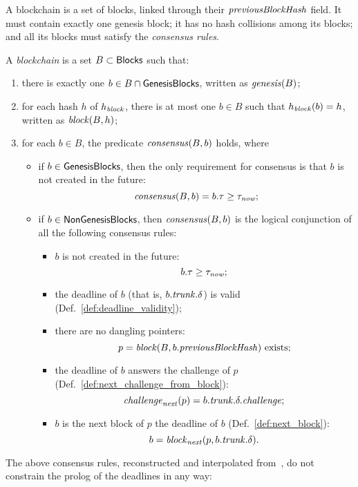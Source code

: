 A blockchain is a set of blocks, linked through their ${\mathit{previousBlockHash}}$ field.
It must contain exactly one genesis block; it has no hash collisions among its blocks;
and all its blocks must satisfy the \emph{consensus rules}.
%
\begin{definition}\label{def:blockchain}
  A \emph{blockchain} is a set $B\subset{\mathsf{Blocks}}$ such that:
  \begin{enumerate}
  \item there is exactly one $b\in B\cap{\mathsf{GenesisBlocks}}$, written as ${\mathit{genesis}}(B)$;
  \item for each hash $h$ of $h_{\mathit{block}}$, there is at most
    one $b\in B$ such that $h_{\mathit{block}}(b)=h$, written as ${\mathit{block}}(B,h)$;
  \item for each $b\in B$, the predicate ${\mathit{consensus}}(B,b)$ holds, where
    \begin{itemize}
    \item if $b\in{\mathsf{GenesisBlocks}}$, then the only requirement for consensus is that
      $b$ is not created in the future:
      \[
      {\mathit{consensus}}(B,b)=b.\tau\ge\tau_{\mathit{now}};
      \]
    \item if $b\in{\mathsf{NonGenesisBlocks}}$, then ${\mathit{consensus}}(B,b)$ is the logical conjunction
      of all the following consensus rules:
      \begin{itemize}
      \item $b$ is not created in the future:
        \[
        b.\tau\ge\tau_{\mathit{now}};
        \]
      \item the deadline of $b$ (that is, $b.{\mathit{trunk}}.\delta$) is valid (Def.~\ref{def:deadline_validity});
      \item there are no dangling pointers:
        \[
        p={\mathit{block}}(B,b.{\mathit{previousBlockHash}})\text{ exists;}
        \]
      \item the deadline of $b$ answers the challenge of $p$ (Def.~\ref{def:next_challenge_from_block}):
        \[
        {\mathit{challenge}}_{\mathit{next}}(p)=b.{\mathit{trunk}}.\delta.{\mathit{challenge}};
        \]
      \item $b$ is the next block of $p$ \wrt the deadline of $b$ (Def.~\ref{def:next_block}):
        \[
        b={\mathit{block}}_{\mathit{next}}(p,b.{\mathit{trunk}}.\delta).
        \]
      \end{itemize}
    \end{itemize}
  \end{enumerate}
\end{definition}
%
The above consensus rules, reconstructed and interpolated
from~\cite{SignumPlotting,SignumSource},
do not constrain the prolog of the deadlines in any way:
